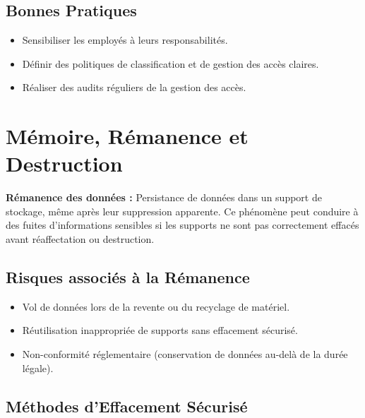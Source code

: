 \subsection{Bonnes Pratiques}
\begin{itemize}
    \item Sensibiliser les employés à leurs responsabilités.
    \item Définir des politiques de classification et de gestion des accès claires.
    \item Réaliser des audits réguliers de la gestion des accès.
\end{itemize}

\section{Mémoire, Rémanence et Destruction}

\begin{boxdef}
\textbf{Rémanence des données :} Persistance de données dans un support de stockage, même après leur suppression apparente. Ce phénomène peut conduire à des fuites d'informations sensibles si les supports ne sont pas correctement effacés avant réaffectation ou destruction.
\end{boxdef}

\subsection{Risques associés à la Rémanence}
\begin{itemize}
    \item Vol de données lors de la revente ou du recyclage de matériel.
    \item Réutilisation inappropriée de supports sans effacement sécurisé.
    \item Non-conformité réglementaire (conservation de données au-delà de la durée légale).
\end{itemize}

\subsection{Méthodes d'Effacement Sécurisé}

